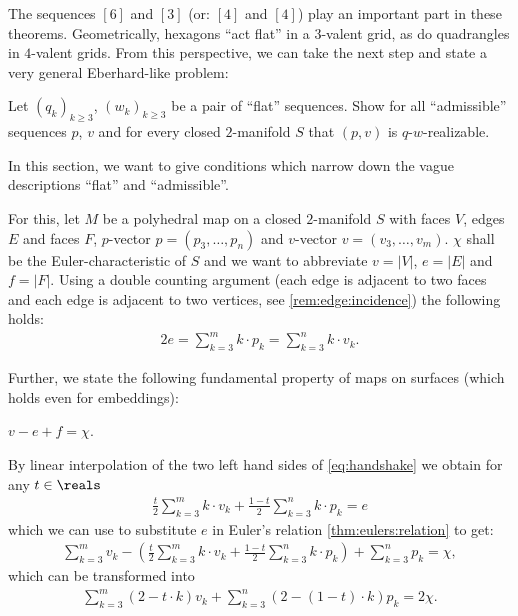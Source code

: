 The sequences $[6]$ and $[3]$ (or: $[4]$ and $[4]$) play an important part in these theorems. Geometrically, hexagons ``act flat'' in a $3$-valent grid, as do quadrangles in $4$-valent grids. From this perspective, we can take the next step and state a very general {\sc Eberhard}-like problem:

\begin{problem}\label{prob:eberhard:unspecified}
  Let $(q_k)_{k \geq 3}$, $(w_k)_{k \geq 3}$ be a pair of ``flat'' sequences. Show for all ``admissible'' sequences $p$, $v$ and for every closed $2$-manifold $S$ that $(p, v)$ is $q$-$w$-realizable.
\end{problem}

In this section, we want to give conditions which narrow down the vague descriptions ``flat'' and ``admissible''. 

For this, let $M$ be a polyhedral map on a closed $2$-manifold $S$ with faces $V$, edges $E$ and faces $F$, $p$-vector $p = (p_3, \dots, p_n)$ and $v$-vector $v = (v_3, \dots, v_m)$. $\chi$ shall be the {\sc Euler}-characteristic of $S$ and we want to abbreviate $v = |V|$, $e = |E|$ and $f = |F|$. Using a double counting argument (each edge is adjacent to two faces and each edge is adjacent to two vertices, see \autoref{rem:edge:incidence}) the following holds:
\begin{align}
  2e = \sum_{k=3}^{m} k \cdot p_k = \sum_{k=3}^{n} k \cdot v_k \label{eq:handshake}.
\end{align}

Further, we state the following fundamental property of maps on surfaces (which holds even for embeddings):
\begin{theorem}\label{thm:eulers:relation} $v - e + f = \chi$.
\end{theorem}

By linear interpolation of the two left hand sides of \eqref{eq:handshake} we obtain for any $t \in \reals$
\begin{align}
  \frac{t}{2} \sum_{k=3}^m k \cdot v_k + \frac{1-t}{2} \sum_{k=3}^n k \cdot p_k = e \label{eq:interpolated:handshake}
\end{align}
 which we can use to substitute $e$ in Euler's relation \autoref{thm:eulers:relation} to get:
\begin{align*}
  \sum_{k=3}^m v_k - \left(\frac{t}{2} \sum_{k=3}^m k \cdot v_k + \frac{1-t}{2} \sum_{k=3}^n k \cdot p_k \right) + \sum_{k=3}^n p_k = \chi,
\end{align*}
which can be transformed into
\begin{align}
  \sum_{k=3}^m (2 - t \cdot k ) v_k + \sum_{k=3}^n ( 2 - (1 - t) \cdot k ) p_k = 2 \chi. \label{eq:general:vp:relation}
\end{align}

